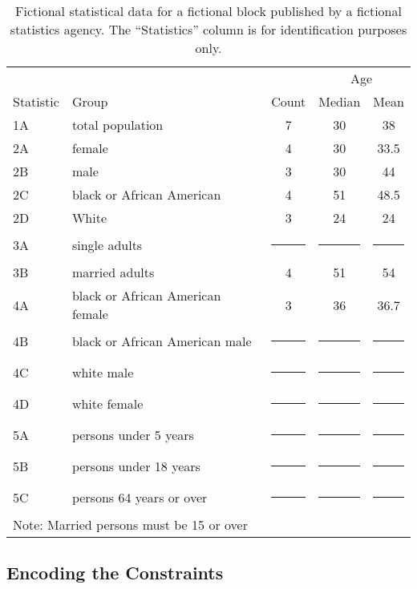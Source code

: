 \documentclass[runningheads]{llncs}
\begin{document}
\newcommand{\cens}{\multicolumn{1}{c|}{\rule{6mm}{3mm}}}
\begin{table}
\caption{Fictional statistical data for a fictional block published by
  a fictional statistics agency. The ``Statistics'' column is for identification
  purposes only.\label{fictional}}
\begin{center}
\begin{tabular}{l|l|c|c|c|}
          &                           &       & \multicolumn{2}{|c|}{Age} \\
Statistic & Group                     & Count & Median & Mean \\
\hline
       1A & total population          & 7     &  30    & 38 \\
\hline
       2A & female                    & 4     &  30    & 33.5 \\
       2B & male                      & 3     &  30    & 44 \\
       2C & black or African American & 4     &  51    & 48.5 \\
       2D & White                     & 3     &  24    & 24 \\
\hline
       3A & single adults             & \cens & \cens  & \cens \\
       3B & married adults            & 4     & 51     & 54 \\
\hline
       4A & black or African American female              & 3     & 36     & 36.7 \\
       4B & black or African American male                & \cens & \cens  & \cens \\
       4C & white male                & \cens & \cens  & \cens \\
       4D & white female              & \cens & \cens  & \cens \\
\hline
       5A & persons under 5 years     & \cens & \cens  & \cens \\
       5B & persons under 18 years    & \cens & \cens  & \cens \\
       5C & persons 64 years or over  & \cens & \cens  & \cens \\
\hline
\multicolumn{5}{l}{Note: Married persons must be 15 or over}
\end{tabular}
\end{center}
\end{table}

\subsection{Encoding the Constraints}
\end{document}
